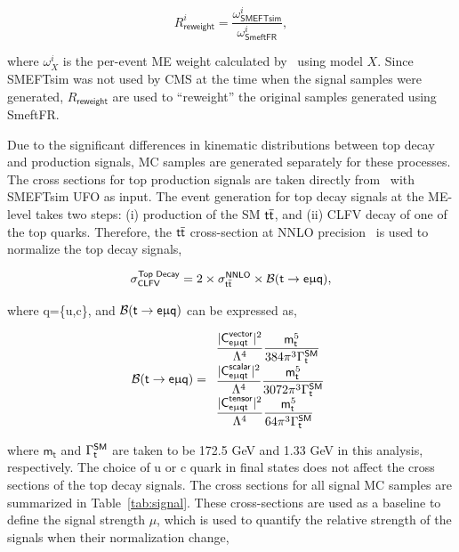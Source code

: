 \begin{equation}
\label{eq:2}
R_{\textsf{reweight}}^{i}=\frac{\omega_{\textsf{SMEFTsim}}^i}{\omega_{\textsf{SmeftFR}}^i},
\end{equation}

where $\omega^{i}_{X}$ is the per-event \ac{ME} weight calculated by \MG~using model $X$. Since SMEFTsim was not used by \ac{CMS} at the time when the signal samples were generated, $R_{\textsf{reweight}}$ are used to ``reweight'' the original samples generated using SmeftFR.

Due to the significant differences in kinematic distributions between top decay and production signals, \ac{MC} samples are generated separately for these processes. The cross sections for top production signals are taken directly from \MG~with SMEFTsim UFO as input. The event generation for top decay signals at the \ac{ME}-level takes two steps: (i) production of the SM $\textsf{t}\overline{\textsf{t}}$, and (ii) \ac{CLFV} decay of one of the top quarks. Therefore, the $\textsf{t}\overline{\textsf{t}}$ cross-section at \ac{NNLO} precision~\cite{Czakon:2011xx} is used to normalize the top decay signals,

\begin{equation}
\label{eq:3}
\sigma_{\textsf{CLFV}}^{\textsf{Top Decay}}=2\times\sigma_{\textsf{t}\overline{\textsf{t}}}^{\textsf{NNLO}}\times\mathcal{B}(\textsf{t}\rightarrow\textsf{e}\upmu\textsf{q}),
\end{equation}

where q=\{u,c\}, and $\mathcal{B}(\textsf{t}\rightarrow\textsf{e}\upmu\textsf{q})$ \cite{Kile:2008rp} can be expressed as,

\begin{equation}
\label{eq:4}
\mathcal{B}(\textsf{t}\rightarrow\textsf{e}\upmu\textsf{q}) = 
 \begin{array}{l}
 \displaystyle
 \frac{|\textsf{C}^{\textsf{vector}}_{\textsf{e}\upmu\textsf{{q}t}}|^2}{\mathrm{\Lambda}^4}\frac{\textsf{m}_\textsf{t}^5}{384\pi^3\mathrm{\Gamma}_{\textsf{t}}^{\textsf{SM}}} \\
 \displaystyle
 \frac{|\textsf{C}^{\textsf{scalar}}_{\textsf{e}\upmu\textsf{{q}t}}|^2}{\mathrm{\Lambda}^4}\frac{\textsf{m}_\textsf{t}^5}{3072\pi^3\mathrm{\Gamma}_{\textsf{t}}^{\textsf{SM}}} \\
 \displaystyle
 \frac{|\textsf{C}^{\textsf{tensor}}_{\textsf{e}\upmu\textsf{{q}t}}|^2}{\mathrm{\Lambda}^4}\frac{\textsf{m}_\textsf{t}^5}{64\pi^3\mathrm{\Gamma}_{\textsf{t}}^{\textsf{SM}}} 
\end{array}
\end{equation}

where $\textsf{m}_{\textsf{t}}$ and $\mathrm{\Gamma}_{\textsf{t}}^{\textsf{SM}}$ are taken to be 172.5 GeV and 1.33 GeV in this analysis, respectively. The choice of u or c quark in final states does not affect the cross sections of the top decay signals. The cross sections for all signal \ac{MC} samples are summarized in Table~\ref{tab:signal}. These cross-sections are used as a baseline to define the signal strength $\mu$, which is used to quantify the relative strength of the signals when their normalization change,

